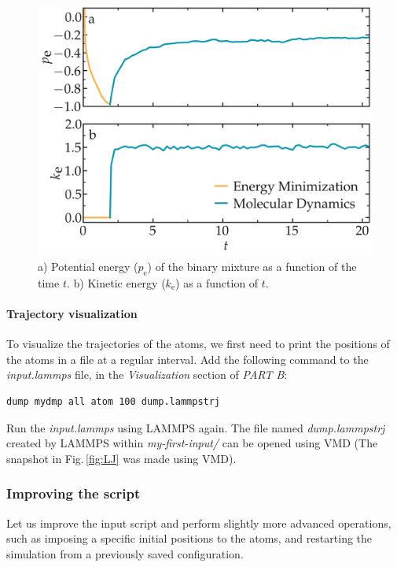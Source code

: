 \documentclass[9pt,tutorial]{livecoms}
\begin{document}
\begin{figure}
\centering
\includegraphics[width=\linewidth]{LJ-energy}
\caption{a) Potential energy ($p_\text{e}$) of the binary mixture as a function of the time $t$. b) Kinetic energy ($k_\text{e}$) as a function of $t$.}
\label{fig:evolution-energy}
\end{figure}

\paragraph{Trajectory visualization}

To visualize the trajectories of the atoms, we first need to print the positions of the atoms in a file at a regular interval. Add the following command to the \textit{input.lammps} file, in the \textit{Visualization} section of \textit{PART B}:
{\normalsize \begin{verbatim}
dump mydmp all atom 100 dump.lammpstrj
\end{verbatim}}
Run the \textit{input.lammps} using LAMMPS again. The file named \textit{dump.lammpstrj} created by LAMMPS within \textit{my-first-input/} can be opened using VMD (The snapshot in Fig.\,\ref{fig:LJ} was made using VMD).

\subsubsection{Improving the script}

Let us improve the input script and perform slightly more advanced operations, such as imposing a specific initial
positions to the atoms, and restarting the simulation from a previously saved configuration. 
\end{document}
